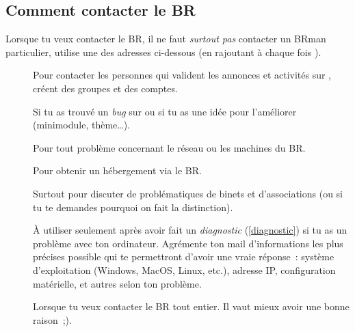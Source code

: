 \subsection{Comment contacter le BR}

Lorsque tu veux contacter le BR, il ne faut \emph{surtout pas} contacter un BRman particulier, utilise une des adresses ci-dessous (en rajoutant à chaque fois ).

\begin{description}

\item[] Pour contacter les personnes qui valident les annonces et activités sur \fkz, créent des groupes et des comptes.

\item[] Si tu as trouvé un \emph{bug} sur \fkz ou si tu as une idée pour l'améliorer (minimodule, thème\dots).

\item[] Pour tout problème concernant le réseau ou les machines du BR.

\item[] Pour obtenir un hébergement via le BR.



\item[] Surtout pour discuter de problématiques de binets et d'associations (ou si tu te demandes pourquoi on fait la distinction).


\item[] À utiliser seulement après avoir fait un \emph{diagnostic} (\ref{diagnostic}) si tu as un problème avec ton ordinateur. Agrémente ton mail d'informations les plus précises possible qui te permettront d'avoir une vraie réponse~: système d'exploitation (Windows, MacOS, Linux, etc.), adresse IP, configuration matérielle, et autres selon ton problème.


\item[] Lorsque tu veux contacter le BR tout entier. Il vaut mieux avoir une bonne raison~;).

\end{description}
